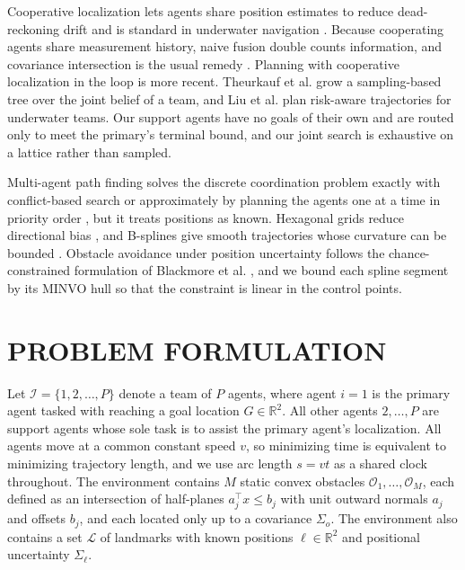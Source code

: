 \documentclass[letterpaper, 10 pt, conference]{ieeeconf}
\theoremstyle{remark}
\begin{document}
Cooperative localization lets agents share position estimates to reduce
dead-reckoning drift \cite{roumeliotis2002dist,bahr2009coop} and is standard
in underwater navigation \cite{paull2014auv}. Because cooperating agents share
measurement history, naive fusion double counts information, and covariance
intersection \cite{julier1997cov} is the usual remedy \cite{carrillo2013ci}.
Planning with cooperative localization in the loop is more recent. Theurkauf
et al. \cite{theurkauf2025coop} grow a sampling-based tree over the joint
belief of a team, and Liu et al. \cite{liu2026risk} plan risk-aware
trajectories for underwater teams. Our support agents have no goals of their
own and are routed only to meet the primary's terminal bound, and our joint
search is exhaustive on a lattice rather than sampled.

Multi-agent path finding solves the discrete coordination problem exactly
with conflict-based search \cite{sharon2021cbs} or approximately by planning
the agents one at a time in priority order
\cite{erdmann1987multiple,silver2005cooperative}, but it treats positions as
known. Hexagonal grids reduce directional bias
\cite{duszak2021hexgrid}, and B-splines give smooth trajectories whose
curvature can be bounded \cite{feng2024bsrrt,karaman2011optimal}. Obstacle
avoidance under position uncertainty follows the chance-constrained
formulation of Blackmore et al. \cite{blackmore2011chance}, and we bound
each spline segment by its MINVO hull \cite{tordesillas2022minvo} so that
the constraint is linear in the control points.

\section{PROBLEM FORMULATION}
\label{sec:pf}
Let $\mathcal{I} = \{1,2,\dots,P\}$ denote a team of $P$ agents, where agent $i=1$
is the primary agent tasked with reaching a goal location $G\in\mathbb{R}^2$.
All other agents $2,\dots,P$ are support agents whose sole task is to assist the
primary agent's localization. All agents move at a common constant speed $v$,
so minimizing time is equivalent to minimizing trajectory length, and we use
arc length $s = vt$ as a shared clock throughout. The environment contains $M$
static convex obstacles $\mathcal{O}_1,\dots,\mathcal{O}_M$, each defined as an
intersection of half-planes $a_j^{\top}x \le b_j$ with unit outward normals
$a_j$ and offsets $b_j$, and each located only up to a covariance $\Sigma_o$.
The environment also contains a set $\mathcal{L}$ of landmarks with known
positions $\ell\in\mathbb{R}^2$ and positional uncertainty $\Sigma_\ell$.
\end{document}
